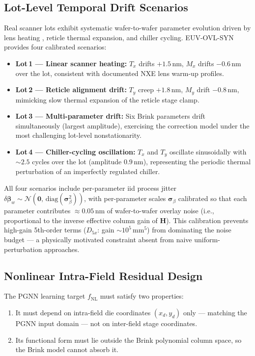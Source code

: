\documentclass[10pt,conference]{IEEEtran}
\begin{document}
\subsection{Lot-Level Temporal Drift Scenarios}
\label{sec:drift}

Real scanner lots exhibit systematic wafer-to-wafer parameter evolution
driven by lens heating \cite{houlihan2007}, reticle thermal expansion, and
chiller cycling.  \textsc{EUV-OVL-SYN} provides four calibrated scenarios:

\begin{itemize}
  \item \textbf{Lot\,1 — Linear scanner heating:}
        $T_x$ drifts $+1.5$\,nm, $M_x$ drifts $-0.6$\,nm over the lot,
        consistent with documented NXE lens warm-up profiles.
  \item \textbf{Lot\,2 — Reticle alignment drift:}
        $T_y$ creep $+1.8$\,nm, $M_y$ drift $-0.8$\,nm, mimicking slow
        thermal expansion of the reticle stage clamp.
  \item \textbf{Lot\,3 — Multi-parameter drift:}
        Six Brink parameters drift simultaneously (largest amplitude),
        exercising the correction model under the most challenging
        lot-level nonstationarity.
  \item \textbf{Lot\,4 — Chiller-cycling oscillation:}
        $T_x$ and $T_y$ oscillate sinusoidally with $\sim\!2.5$ cycles over
        the lot (amplitude $0.9$\,nm), representing the periodic thermal
        perturbation of an imperfectly regulated chiller.
\end{itemize}

All four scenarios include per-parameter iid process jitter
$\delta\bm{\beta}_w \sim \mathcal{N}(\mathbf{0},\,\text{diag}(\bm{\sigma}_\beta^2))$,
with per-parameter scales $\bm{\sigma}_\beta$ calibrated so that each
parameter contributes $\approx 0.05$\,nm of wafer-to-wafer overlay noise
(i.e., proportional to the inverse effective column gain of $\mathbf{H}$).
This calibration prevents high-gain 5th-order terms ($D_{5x}$: gain
$\sim\!10^5$\,mm$^5$) from dominating the noise budget — a physically
motivated constraint absent from naive uniform-perturbation approaches.

\subsection{Nonlinear Intra-Field Residual Design}
\label{sec:nonlinear}

The PGNN learning target $f_{\mathrm{NL}}$ must satisfy two properties:
\begin{enumerate}
  \item It must depend on intra-field die coordinates $(x_d, y_d)$ only —
        matching the PGNN input domain — not on inter-field stage coordinates.
  \item Its functional form must lie outside the Brink polynomial column
        space, so the Brink model cannot absorb it.
\end{enumerate}
\end{document}
